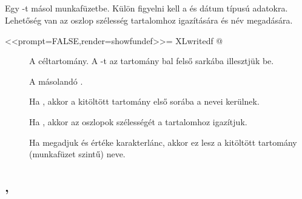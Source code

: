 \subsection{}

Egy -t másol  munkafüzetbe. Külön figyelni kell
a  és dátum típusú 
adatokra. Lehetőség van az oszlop szélesség tartalomhoz igazítására és
név megadására. 
\begin{Rnw}
<<prompt=FALSE,render=showfundef>>=
XLwritedf
@
\end{Rnw}
\begin{description}
\item[] A céltartomány. A  -t
  az  tartomány bal felső sarkába illesztjük be. 
\item[] A másolandó .
\item[] Ha , akkor a kitöltött tartomány
  első sorába a  nevei kerülnek. 
\item[] Ha , akkor az oszlopok szélességét a
  tartalomhoz igazítjuk. 
\item[] Ha megadjuk és értéke karakterlánc, akkor ez
  lesz a kitöltött tartomány (munkafüzet szintű) neve.
\end{description}

\subsection{, }

